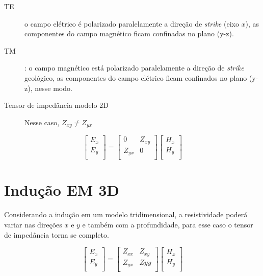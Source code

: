 \begin{description}
	\item [TE] o campo elétrico é polarizado paralelamente a direção de \textit{strike} (eixo $x$), as componentes do campo magnético ficam confinadas no plano (y-z).
\end{description}

\begin{description}
	\item [TM]: o campo magnético está polarizado paralelamente a direção de \textit{strike} geológico, as componentes do campo elétrico ficam confinados no plano (y-z), nesse modo.  
	
\end{description}



\begin{description}
	\item[Tensor de impedância modelo 2D]
	Nesse caso, $Z_{xy}\neq Z_{yx}$
\end{description}

	\begin{equation}
	\left[\begin{array}{c}
	E_{x} \\
	E_{y} \\
	\end{array}\right] =
	\left[\begin{array}{cc}
	0 &  Z_{xy} \\
	Z_{yx} &  0 \\
	\end{array}\right]	\left[\begin{array}{c}
	H_{x} \\
	H_{y} \\
	\end{array}\right]
	\end{equation}

\section{Indução EM 3D}


Considerando a indução em um modelo tridimensional, a resistividade poderá variar nas direções $x$ e $y$ e também com a profundidade, para esse caso o tensor de impedância torna se completo.



	\begin{equation}
	\left[\begin{array}{c}
	E_{x} \\
	E_{y} \\
	\end{array}\right] =
	\left[\begin{array}{cc}
	Z_{xx} &  Z_{xy} \\
	Z_{yx} &  Z{yy} \\
	\end{array}\right]	\left[\begin{array}{c}
	H_{x} \\
	H_{y} \\
	\end{array}\right]
	\end{equation}


